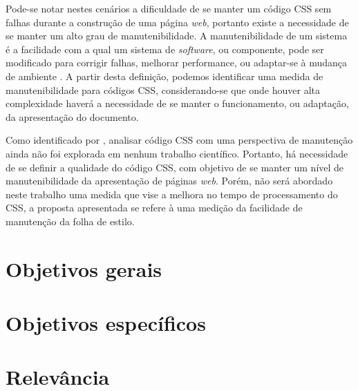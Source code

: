 Pode-se notar nestes cenários a dificuldade de se manter um código CSS sem falhas durante a construção de uma página \textit{web}, portanto existe a necessidade de se manter um alto grau de manutenibilidade. A manutenibilidade de um sistema é a facilidade com a qual um sistema de \textit{software}, ou componente, pode ser modificado para corrigir falhas, melhorar performance, ou adaptar-se à mudança de ambiente \cite{Ieee1990}. A partir desta definição, podemos identificar uma medida de manutenibilidade para códigos CSS, considerando-se que onde houver alta complexidade haverá a necessidade de se manter o funcionamento, ou adaptação, da apresentação do documento.

Como identificado por , analisar código CSS com uma perspectiva de manutenção ainda não foi explorada em nenhum trabalho científico. Portanto, há necessidade de se definir a qualidade do código CSS, com objetivo de se manter um nível de manutenibilidade da apresentação de páginas \textit{web}. Porém, não será abordado neste trabalho uma medida que vise a melhora no tempo de processamento do CSS, a proposta apresentada se refere à uma medição da facilidade de manutenção da folha de estilo.


\section{Objetivos gerais}
\label{sec:objg}



\section{Objetivos específicos}
\label{sec:obje}

\section{Relevância}
\label{sec:rel}
